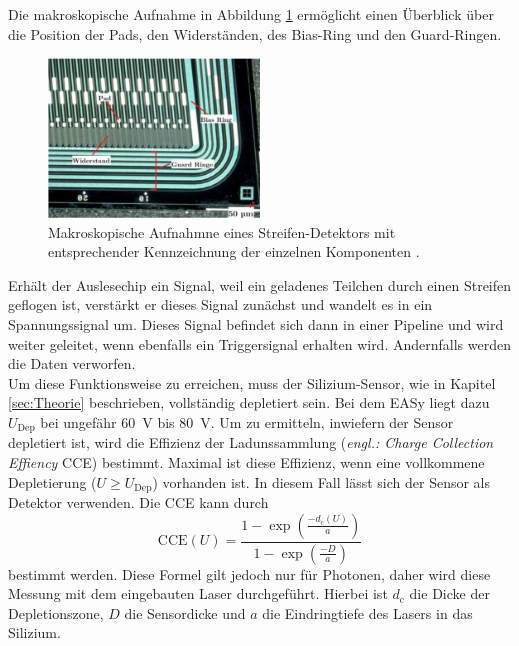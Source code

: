 Die makroskopische Aufnahme in Abbildung \ref{fig:streifendetektor} ermöglicht einen Überblick über die Position der Pads, den Widerständen, des Bias-Ring und den Guard-Ringen.
\begin{figure}[htb]
  \centering
  \includegraphics[width=0.5\textwidth]{graphics/Sensor.png}
  \caption{Makroskopische Aufnahmne eines Streifen-Detektors mit entsprechender Kennzeichnung der einzelnen Komponenten \cite{anleitung}.}
  \label{fig:streifendetektor}
\end{figure}
Erhält der Auslesechip ein Signal, weil ein geladenes Teilchen durch einen Streifen geflogen ist, verstärkt er dieses Signal zunächst und wandelt es in ein Spannungssignal um. Dieses Signal befindet sich dann in einer Pipeline und wird weiter geleitet, wenn ebenfalls ein Triggersignal erhalten wird. Andernfalls werden die Daten verworfen.\\
Um diese Funktionsweise zu erreichen, muss der Silizium-Sensor, wie in Kapitel \ref{sec:Theorie} beschrieben, vollständig depletiert sein. Bei dem EASy liegt dazu $U_\text{Dep}$ bei ungefähr \SI{60}{\volt} bis \SI{80}{\volt}. Um zu ermitteln, inwiefern der Sensor depletiert ist, wird die Effizienz der Ladunssammlung (\textit{engl.: Charge Collection Effiency} CCE) bestimmt. Maximal ist diese Effizienz, wenn eine vollkommene Depletierung ($U \ge U_\text{Dep}$) vorhanden ist. In diesem Fall lässt sich der Sensor als Detektor verwenden. Die CCE kann durch
\begin{equation}
  \text{CCE}(U) = \frac{1 - \exp\left(\frac{-d_\text{c}(U)}{a}\right)}{1 - \exp\left(\frac{-D}{a}\right)}
  \label{eqn:20}
\end{equation}
bestimmt werden. Diese Formel gilt jedoch nur für Photonen, daher wird diese Messung mit dem eingebauten Laser durchgeführt. Hierbei ist $d_\text{c}$ die Dicke der Depletionszone, $D$ die Sensordicke und $a$ die Eindringtiefe des Lasers in das Silizium.

\FloatBarrier
